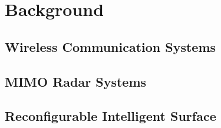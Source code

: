\chapter{Background}\label{cha:theoretical-background}

\section{Wireless Communication Systems}\label{sec:wireless-communication-system}
    

\section{MIMO Radar Systems} \label{sec:mimo-radar-system}
    

\section{Reconfigurable Intelligent Surface} \label{sec:reconfigurable-intelligent-surface}
    

